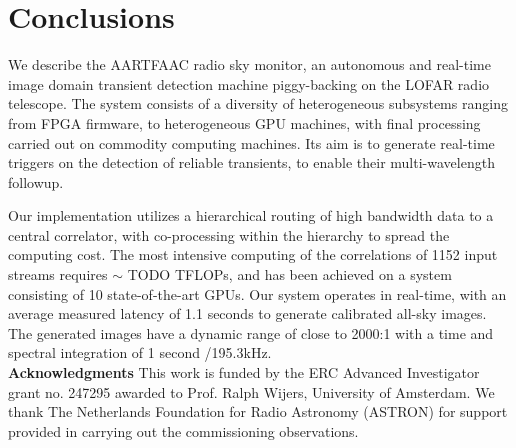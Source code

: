 \documentclass{ws-jai}
\begin{document}
\section {\label{sec:conclusion} Conclusions}
We describe  the AARTFAAC radio sky  monitor, an autonomous and  real-time image
domain   transient  detection   machine   piggy-backing  on   the  LOFAR   radio
telescope.  The  system consists  of  a  diversity of  heterogeneous  subsystems
ranging from FPGA firmware, to heterogeneous GPU machines, with final processing
carried out on  commodity computing machines.  Its aim is  to generate real-time
triggers   on  the   detection   of  reliable   transients,   to  enable   their
multi-wavelength followup.

Our implementation utilizes  a hierarchical routing of high bandwidth  data to a
central  correlator,  with co-processing  within  the  hierarchy to  spread  the
computing cost.  The most intensive computing  of the correlations of 1152 input
streams  requires  $\sim$  TODO  TFLOPs,  and has  been  achieved  on  a  system
consisting of 10 state-of-the-art GPUs.   Our system operates in real-time, with
an  average measured  latency  of  1.1 seconds  to  generate calibrated  all-sky
images. The generated images have a dynamic range of close to 2000:1 with a time
and spectral integration of 1 second /195.3kHz.\\


\noindent  \textbf{Acknowledgments} This  work  is funded  by  the ERC  Advanced
Investigator  grant no.  247295 awarded  to Prof.   Ralph Wijers,  University of
Amsterdam.  We thank The Netherlands Foundation for Radio Astronomy (ASTRON) for
support provided in carrying out the commissioning observations.



\end{document}
